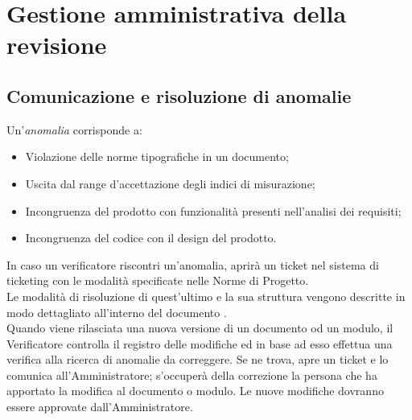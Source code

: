 \section{Gestione amministrativa della revisione}{
\subsection{Comunicazione e risoluzione di anomalie}{
Un'\textit{anomalia} corrisponde a:
\begin{itemize}
	\item Violazione delle norme tipografiche in un documento;
	\item Uscita dal range d'accettazione degli indici di misurazione;
	\item Incongruenza del prodotto con funzionalità presenti nell'analisi dei requisiti;
	\item Incongruenza del codice con il design del prodotto.
\end{itemize}

In caso un verificatore riscontri un'anomalia, aprirà un ticket nel sistema di ticketing con le modalità specificate nelle Norme di Progetto. \\
Le modalità di risoluzione di quest'ultimo e la sua struttura vengono descritte in modo dettagliato all'interno del documento \href{run:../../Interni/\fNormeDiProgetto}{\fEscapeNormeDiProgetto}. \\
Quando viene rilasciata una nuova versione di un documento od un modulo, il Verificatore controlla il registro delle modifiche ed in base ad esso effettua una verifica alla ricerca di anomalie da correggere. Se ne trova, apre un ticket e lo comunica all'Amministratore; s'occuperà della correzione la persona che ha apportato la modifica al documento o modulo. Le nuove modifiche dovranno essere approvate dall'Amministratore.
}
}